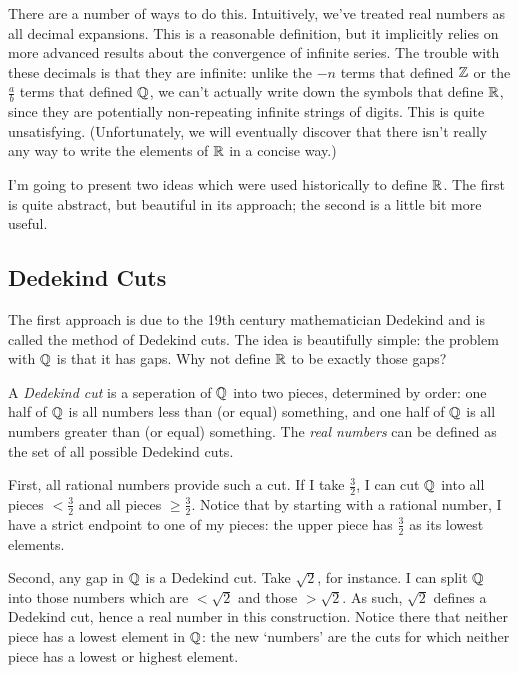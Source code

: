 \documentclass[fleqn]{report}
\begin{document}
There are a number of ways to do this. Intuitively, we've
treated real numbers as all decimal expansions. This is a
reasonable definition, but it implicitly relies on more
advanced results about the convergence of infinite series.
The trouble with these decimals is that they are infinite:
unlike the $-n$ terms that defined $\mathbb{Z}$ or the $\frac{a}{b}$
terms that defined $\mathbb{Q}$, we can't actually write down the
symbols that define $\mathbb{R}$, since they are potentially
non-repeating infinite strings of digits. This is quite
unsatisfying. (Unfortunately, we will eventually discover that
there isn't really any way to write the elements of $\mathbb{R}$ in a
concise way.)

I'm going to present two ideas which were used historically to
define $\mathbb{R}$. The first is quite abstract, but beautiful in
its approach; the second is a little bit more useful.

\subsection{Dedekind Cuts}
\label{dedekind-cuts}

The first approach is due to the 19th century mathematician
Dedekind and is called the method of Dedekind cuts. The idea
is beautifully simple: the problem with $\mathbb{Q}$ is that it has
gaps. Why not define $\mathbb{R}$ to be exactly those gaps? 

\begin{defn}
A \emph{Dedekind cut} is a seperation of $\mathbb{Q}$ into two pieces,
determined by order: one half of $\mathbb{Q}$ is all numbers less
than (or equal) something, and one half of $\mathbb{Q}$ is all
numbers greater than (or equal) something. The \emph{real
numbers} can be defined as the set of all possible Dedekind cuts.
\end{defn}

First, all rational numbers provide such a cut. If I take
$\frac{3}{2}$, I can cut $\mathbb{Q}$ into all pieces $< \frac{3}{2}$
and all pieces $\geq \frac{3}{2}$. Notice that by starting
with a rational number, I have a strict endpoint to one of my
pieces: the upper piece has $\frac{3}{2}$ as its lowest
elements.

Second, any gap in $\mathbb{Q}$ is a Dedekind cut. Take $\sqrt{2}$, for
instance. I can split $\mathbb{Q}$ into those numbers which are $<
\sqrt{2}$ and those $> \sqrt{2}$. As such, $\sqrt{2}$ defines
a Dedekind cut, hence a real number in this construction.
Notice there that neither piece has a lowest element in $\mathbb{Q}$:
the new `numbers' are the cuts for which neither piece has a
lowest or highest element. 
\end{document}
